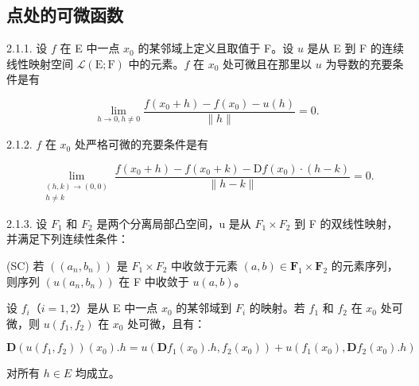 \subsection{点处的可微函数}

2.1.1. 设 \(f\) 在 E 中一点 \(x_{0}\) 的某邻域上定义且取值于 F。设 \(u\) 是从 E 到 F 的连续线性映射空间 \(\mathcal{L}(\mathrm{E};\mathrm{F})\) 中的元素。\(f\) 在 \(x_{0}\) 处可微且在那里以 \(u\) 为导数的充要条件是有

\[
\lim _ {h \rightarrow 0, h \neq 0} \frac {f (x _ {0} + h) - f (x _ {0}) - u (h)}{\| h \|} = 0.
\]

2.1.2. \(f\) 在 \(x_{0}\) 处严格可微的充要条件是有

\[
\lim_{\substack{(h,k)\to (0,0)\\ h\neq k}}\frac{f(x_{0} + h) - f(x_{0} + k) - \mathrm{D}f(x_{0})\cdot(h - k)}{\|h - k\|} = 0.
\]

2.1.3. 设 \(F_{1}\) 和 \(F_{2}\) 是两个分离局部凸空间，u 是从 \(F_{1} \times F_{2}\) 到 F 的双线性映射，并满足下列连续性条件：

(SC) 若 \(((a_{n}, b_{n}))\) 是 \(F_{1} \times F_{2}\) 中收敛于元素 \((a, b) \in \mathbf{F}_{1} \times \mathbf{F}_{2}\) 的元素序列，则序列 \((u(a_{n}, b_{n}))\) 在 F 中收敛于 \(u(a, b)\)。

设 \(f_{i}\)（\(i = 1, 2\)）是从 E 中一点 \(x_{0}\) 的某邻域到 \(F_{i}\) 的映射。若 \(f_{1}\) 和 \(f_{2}\) 在 \(x_{0}\) 处可微，则 \(u(f_{1}, f_{2})\) 在 \(x_{0}\) 处可微，且有：

\[
\mathbf {D} (u (f _ {1}, f _ {2})) (x _ {0}). h = u (\mathbf {D} f _ {1} (x _ {0}). h, f _ {2} (x _ {0})) + u (f _ {1} (x _ {0}), \mathbf {D} f _ {2} (x _ {0}). h)
\]

对所有 \(h \in E\) 均成立。

